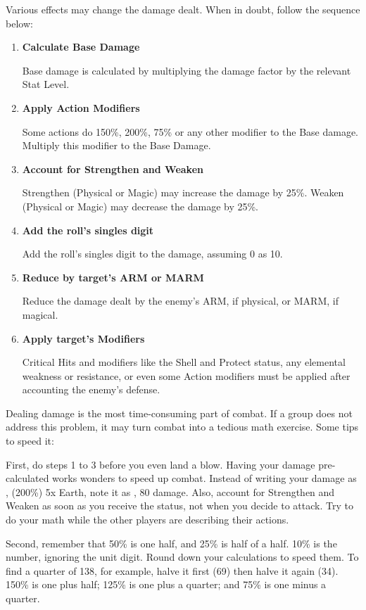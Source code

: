 \begin{multicols}{2}
Various effects may change the damage dealt. When in doubt, follow the sequence below:
\begin{enumerate}
\item \textbf{Calculate Base Damage}

Base damage is calculated by multiplying the damage factor by the relevant Stat Level.

\item \textbf{Apply Action Modifiers}

Some actions do 150\%, 200\%, 75\% or any other modifier to the Base damage. Multiply this modifier to the Base Damage.

\item \textbf{Account for Strengthen and Weaken}

Strengthen (Physical or Magic) may increase the damage by 25\%. Weaken (Physical or Magic) may decrease the damage by 25\%.

\item \textbf{Add the roll's singles digit}

Add the roll's singles digit to the damage, assuming 0 as 10.

\item \textbf{Reduce by target's ARM or MARM}

Reduce the damage dealt by the enemy's ARM, if physical, or MARM, if magical.

\item \textbf{Apply target's Modifiers}

Critical Hits and modifiers like the Shell and Protect status, any elemental weakness or resistance, or even some Action modifiers must be applied after accounting the enemy's defense.
\end{enumerate}

\begin{boco}
Dealing damage is the most time-consuming part of combat. If a group does not address this problem, it may turn combat into a tedious math exercise. Some tips to speed it:

First, do steps 1 to 3 before you even land a blow. Having your damage pre-calculated works wonders to speed up combat. Instead of writing your damage as , (200\%) 5x Earth, note it as , 80 damage. Also, account for Strengthen and Weaken as soon as you receive the status, not when you decide to attack. Try to do your math while the other players are describing their actions.

Second, remember that 50\% is one half, and 25\% is half of a half. 10\% is the number, ignoring the unit digit. Round down your calculations to speed them. To find a quarter of 138, for example, halve it first (69) then halve it again (34). 150\% is one plus half; 125\% is one plus a quarter; and 75\% is one minus a quarter.


\end{boco}
\end{multicols}
